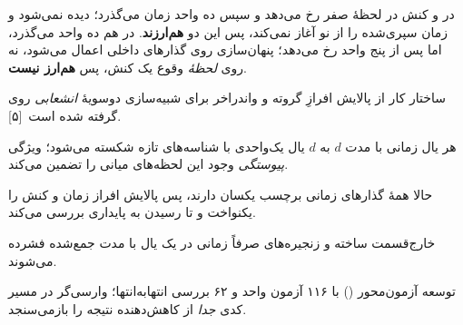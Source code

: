 {در  و  کنش  در لحظهٔ صفر رخ می‌دهد و سپس ده واحد
زمان می‌گذرد؛  دیده نمی‌شود و زمان سپری‌شده را از نو آغاز نمی‌کند، پس
این دو \textbf{هم‌ارزند}. در  هم ده واحد می‌گذرد، اما  پس از
پنج واحد رخ می‌دهد؛ پنهان‌سازی روی گذارهای داخلی اعمال می‌شود، نه روی
\emph{لحظهٔ} وقوع یک کنش، پس \textbf{هم‌ارز نیست}.

\vspace{.04cm}
{\fontsize{19}{24}\selectfont
{} ساختار کار از پالایش افرازِ گروته و واندراخر
برای شبیه‌سازی دوسویهٔ \emph{انشعابی} روی  گرفته شده است~[۵].\par
{} هر یال زمانی با مدت $d$ به $d$ یال یک‌واحدی با شناسه‌های تازه
شکسته می‌شود؛ ویژگی \emph{پیوستگی}  وجود این لحظه‌های میانی را تضمین
می‌کند.\par
{} حالا همهٔ گذارهای زمانی برچسب یکسان  دارند، پس
پالایش افراز زمان و کنش را یکنواخت و تا رسیدن به پایداری بررسی می‌کند.\par
{} خارج‌قسمت ساخته و زنجیره‌های صرفاً زمانی در یک یال با مدت
جمع‌شده فشرده می‌شوند.\par
\vspace{.10cm}
 توسعه آزمون‌محور () با ۱۱۶ آزمون واحد و ۶۲
بررسی انتهابه‌انتها؛ وارسی‌گر در مسیر کدی \emph{جدا} از کاهش‌دهنده نتیجه را
بازمی‌سنجد.\par}
}

